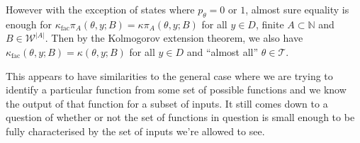 However with the exception of states where $p_\theta=0$ or $1$, almost sure equality is enough for $\kappa_{\mathrm{fac}}\pi_A(\theta,y;B)=\kappa\pi_A(\theta,y;B)$ for all $y\in D$, finite $A\subset\mathbb{N}$ and $B\in \mathcal{W}^{|A|}$. Then by the Kolmogorov extension theorem, we also have $\kappa_{\mathrm{fac}} (\theta,y;B) = \kappa(\theta,y;B)$ for all $y\in D$ and ``almost all'' $\theta\in \mathscr{T}$.

This appears to have similarities to the general case where we are trying to identify a particular function from some set of possible functions and we know the output of that function for a subset of inputs. It still comes down to a question of whether or not the set of functions in question is small enough to be fully characterised by the set of inputs we're allowed to see.




